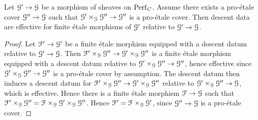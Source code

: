 \begin{lemma}\label{lemma2218}
Let $\mathcal{G}'\to\mathcal{G}$ be a morphism of sheaves on $\mathrm{Perf}_{C}$. Assume there exists a pro-\'{e}tale cover $\mathcal{G}''\to\mathcal{G}$
such that $\mathcal{G}'\times_{\mathcal{G}}\mathcal{G}''\to\mathcal{G}''$ is a pro-\'{e}tale cover.
Then descent data are effective for finite \'{e}tale morphisms of $\mathcal{G}'$ relative to $\mathcal{G}'\to\mathcal{G}$.
\end{lemma}
\begin{proof}
Let $\mathcal{F}'\to\mathcal{G}'$ be a  finite \'{e}tale morphism equipped with a descent datum relative to $\mathcal{G}'\to\mathcal{G}$.
Then $\mathcal{F}'\times_{\mathcal{G}}\mathcal{G}''\to\mathcal{G}'\times_{\mathcal{G}}\mathcal{G}''$ is a finite \'{e}tale morphism equipped with a descent datum relative to $\mathcal{G}'\times_{\mathcal{G}}\mathcal{G}''\to\mathcal{G}''$, hence effective since
$\mathcal{G}'\times_{\mathcal{G}}\mathcal{G}''\to\mathcal{G}''$ is a pro-\'{e}tale cover by assumption.
The descent datum then induces a descent datum for $\mathcal{F}'\times_{\mathcal{G}}\mathcal{G}''\to\mathcal{G}'\times_{\mathcal{G}}\mathcal{G}''$ relative to $\mathcal{G}'\times_{\mathcal{G}}\mathcal{G}''\to\mathcal{G}$,
which is effective.
Hence there is a finite \'{e}tale morphism $\mathcal{F}\to\mathcal{G}$ such that $\mathcal{F}'\times_{\mathcal{G}}\mathcal{G}'' = \mathcal{F}\times_{\mathcal{G}}\mathcal{G}'\times_{\mathcal{G}}\mathcal{G}''$.
Hence
$\mathcal{F}'=\mathcal{F}\times_{\mathcal{G}}\mathcal{G}'$, since $\mathcal{G}''\to\mathcal{G}$ is a pro-\'{e}tale cover.
\end{proof}




















